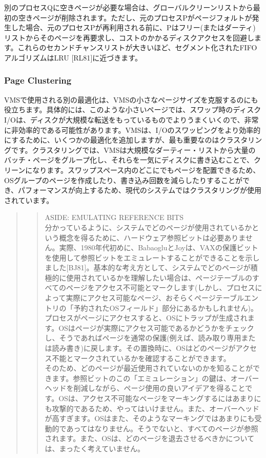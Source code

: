 別のプロセスQに空きページが必要な場合は、グローバルクリーンリストから最初の空きページが削除されます。ただし、元のプロセスPがページフォルトが発生した場合、元のプロセスPが再利用される前に、Pはフリー(またはダーティ)リストからそのページを再要求し、コストのかかるディスクアクセスを回避します。これらのセカンドチャンスリストが大きいほど、セグメント化されたFIFOアルゴリズムはLRU
{[}RL81{]}に近づきます。

\hypertarget{page-clustering}{%
\subsubsection*{Page Clustering}\label{page-clustering}}

VMSで使用される別の最適化は、VMSの小さなページサイズを克服するのにも役立ちます。具体的には、このような小さいページでは、スワップ時のディスクI/Oは、ディスクが大規模な転送をもっているものでよりうまくいくので、非常に非効率的である可能性があります。VMSは、I/Oのスワッピングをより効率的にするために、いくつかの最適化を追加しますが、最も重要なのはクラスタリングです。クラスタリングでは、VMSは大規模なダーティー・リストから大量のバッチ・ページをグループ化し、それらを一気にディスクに書き込むことで、クリーンになります。スワップスペース内のどこにでもページを配置できるため、OSグループのページを作成したり、書き込み回数を減らしたりすることができ、パフォーマンスが向上するため、現代のシステムではクラスタリングが使用されています。

\begin{quote}
\begin{quote}
ASIDE: EMULATING REFERENCE BITS\\
分かっているように、システムでどのページが使用されているかという概念を得るために、ハードウェア参照ビットは必要ありません。実際、1980年代初めに、BabaogluとJoyは、VAXの保護ビットを使用して参照ビットをエミュレートすることができることを示しました{[}BJ81{]}。基本的な考え方として、システムでどのページが積極的に使用されているかを理解したい場合は、ページテーブルのすべてのページをアクセス不可能とマークします(しかし、プロセスによって実際にアクセス可能なページ、おそらくページテーブルエントリの「予約されたOSフィールド」部分にあるかもしれません)。\\
プロセスがページにアクセスすると、OSにトラップが生成されます。OSはページが実際にアクセス可能であるかどうかをチェックし、そうであればページを通常の保護(例えば、読み取り専用または読み書き)に戻します。その置換時に、OSはどのページがアクセス不能とマークされているかを確認することができます。\\
そのため、どのページが最近使用されていないのかを知ることができます。参照ビットのこの「エミュレーション」の鍵は、オーバーヘッドを削減しながら、ページ使用の良いアイデアを得ることです。OSは、アクセス不可能なページをマーキングするにはあまりにも攻撃的であるため、やってはいけません。また、オーバーヘッドが高すぎます。OSはまた、そのようなマーキングではあまりにも受動的であってはなりません。そうでないと、すべてのページが参照されます。また、OSは、どのページを退去させるべきかについては、まったく考えていません。
\end{quote}
\end{quote}


